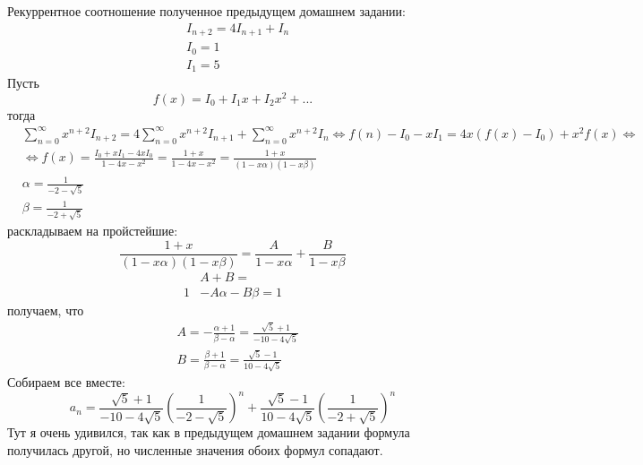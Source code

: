 \documentclass[a4paper,12pt]{article}
\begin{document}
\begin{Solution}

Рекуррентное соотношение полученное  предыдущем домашнем задании:
\[
	\begin{split}
		& I_{n+2} = 4I_{n+1} + I_n \\
		& I_0 = 1 \\
		& I_1 = 5
	\end{split}
\]
Пусть
\[
	f\left(x\right) = I_0 + I_1 x + I_2 x^2 + ...
\]
тогда
\[
	\begin{split}
		& \sum_{n=0}^{\infty} x^{n+2} I_{n+2} = 4\sum_{n=0}^{\infty} x^{n+2} I_{n+1} + \sum_{n=0}^{\infty} x^{n+2} I_n \Leftrightarrow f\left(n\right) - I_0 - x I_1 = 4 x \left(f\left(x\right) - I_0\right) + x^2 f\left(x\right) \Leftrightarrow \\
		& \Leftrightarrow f\left(x\right) = \frac{I_0 + x I_1 - 4x I_0}{1 - 4x - x^2} = \frac{1 + x}{1-4x-x^2} = \frac{1+x}{\left(1-x\alpha\right)\left(1-x\beta\right)} \\
		& \alpha = \frac{1}{-2-\sqrt{5}} \\
		& \beta = \frac{1}{-2+\sqrt{5}}
	\end{split}
\]
раскладываем на пройстейшие:
\[
	\frac{1+x}{\left(1-x\alpha\right)\left(1-x\beta\right)} = \frac{A}{1 - x\alpha} + \frac{B}{1 - x\beta}
\]
\[
	\begin{split}
		& A+B= \\1
		& -A\alpha-B\beta=1
	\end{split}
\]
получаем, что 
\[
	\begin{split}
		& A = - \frac{\alpha+1}{\beta-\alpha} = \frac{\sqrt{5}+1}{-10-4\sqrt{5}} \\
		& B = \frac{\beta+1}{\beta-\alpha} = \frac{\sqrt{5}-1}{10-4\sqrt{5}}
	\end{split}
\]
Собираем все вместе:
\[
	a_n = \frac{\sqrt{5}+1}{-10-4\sqrt{5}} {\left(\frac{1}{-2-\sqrt{5}}\right)}^n + \frac{\sqrt{5}-1}{10-4\sqrt{5}} {\left(\frac{1}{-2+\sqrt{5}}\right)}^n
\]
Тут я очень удивился, так как в предыдущем домашнем задании формула получилась другой, но численные значения обоих формул сопадают.
\end{Solution}
\end{document}
